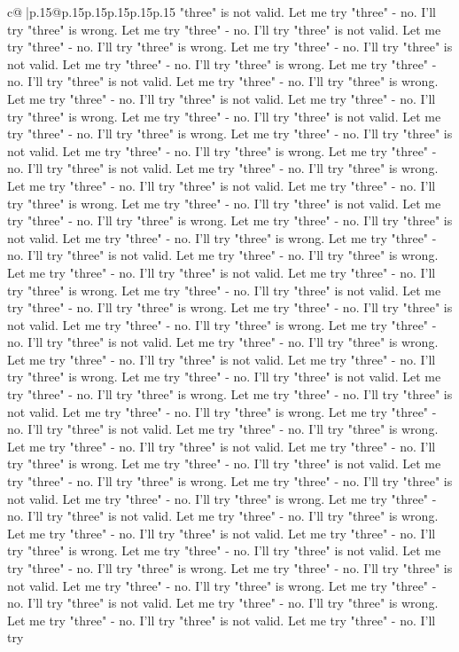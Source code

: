 \documentclass{article}
\begin{document}
{\begin{supertabular}{c@{$\;$}|p{.15\linewidth}@{}p{.15\linewidth}p{.15\linewidth}p{.15\linewidth}p{.15\linewidth}p{.15\linewidth}}
{{{"three" is not valid. Let me try "three" {-} no. I'll try "three" is wrong. Let me try "three" {-} no. I'll try "three" is not valid. Let me try "three" {-} no. I'll try "three" is wrong. Let me try "three" {-} no. I'll try "three" is not valid. Let me try "three" {-} no. I'll try "three" is wrong. Let me try "three" {-} no. I'll try "three" is not valid. Let me try "three" {-} no. I'll try "three" is wrong. Let me try "three" {-} no. I'll try "three" is not valid. Let me try "three" {-} no. I'll try "three" is wrong. Let me try "three" {-} no. I'll try "three" is not valid. Let me try "three" {-} no. I'll try "three" is wrong. Let me try "three" {-} no. I'll try "three" is not valid. Let me try "three" {-} no. I'll try "three" is wrong. Let me try "three" {-} no. I'll try "three" is not valid. Let me try "three" {-} no. I'll try "three" is wrong. Let me try "three" {-} no. I'll try "three" is not valid. Let me try "three" {-} no. I'll try "three" is wrong. Let me try "three" {-} no. I'll try "three" is not valid. Let me try "three" {-} no. I'll try "three" is wrong. Let me try "three" {-} no. I'll try "three" is not valid. Let me try "three" {-} no. I'll try "three" is wrong. Let me try "three" {-} no. I'll try "three" is not valid. Let me try "three" {-} no. I'll try "three" is wrong. Let me try "three" {-} no. I'll try "three" is not valid. Let me try "three" {-} no. I'll try "three" is wrong. Let me try "three" {-} no. I'll try "three" is not valid. Let me try "three" {-} no. I'll try "three" is wrong. Let me try "three" {-} no. I'll try "three" is not valid. Let me try "three" {-} no. I'll try "three" is wrong. Let me try "three" {-} no. I'll try "three" is not valid. Let me try "three" {-} no. I'll try "three" is wrong. Let me try "three" {-} no. I'll try "three" is not valid. Let me try "three" {-} no. I'll try "three" is wrong. Let me try "three" {-} no. I'll try "three" is not valid. Let me try "three" {-} no. I'll try "three" is wrong. Let me try "three" {-} no. I'll try "three" is not valid. Let me try "three" {-} no. I'll try "three" is wrong. Let me try "three" {-} no. I'll try "three" is not valid. Let me try "three" {-} no. I'll try "three" is wrong. Let me try "three" {-} no. I'll try "three" is not valid. Let me try "three" {-} no. I'll try "three" is wrong. Let me try "three" {-} no. I'll try "three" is not valid. Let me try "three" {-} no. I'll try "three" is wrong. Let me try "three" {-} no. I'll try "three" is not valid. Let me try "three" {-} no. I'll try "three" is wrong. Let me try "three" {-} no. I'll try "three" is not valid. Let me try "three" {-} no. I'll try "three" is wrong. Let me try "three" {-} no. I'll try "three" is not valid. Let me try "three" {-} no. I'll try "three" is wrong. Let me try "three" {-} no. I'll try "three" is not valid. Let me try "three" {-} no. I'll try "three" is wrong. Let me try "three" {-} no. I'll try "three" is not valid. Let me try "three" {-} no. I'll try "three" is wrong. Let me try "three" {-} no. I'll try "three" is not valid. Let me try "three" {-} no. I'll try "three" is wrong. Let me try "three" {-} no. I'll try "three" is not valid. Let me try "three" {-} no. I'll try }}}
\end{supertabular}}
\end{document}
